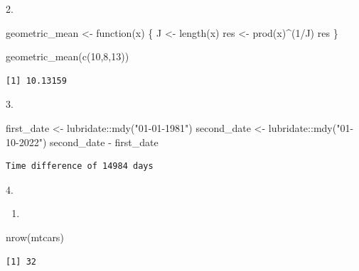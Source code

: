 \documentclass[
  letterpaper,
  DIV=11,
  numbers=noendperiod]{scrreprt}
\newenvironment{Shaded}{\begin{snugshade}}{\end{snugshade}}
\newcommand{\ControlFlowTok}[1]{\textcolor[rgb]{0.00,0.23,0.31}{#1}}
\newcommand{\DecValTok}[1]{\textcolor[rgb]{0.68,0.00,0.00}{#1}}
\newcommand{\FunctionTok}[1]{\textcolor[rgb]{0.28,0.35,0.67}{#1}}
\newcommand{\NormalTok}[1]{\textcolor[rgb]{0.00,0.23,0.31}{#1}}
\newcommand{\OtherTok}[1]{\textcolor[rgb]{0.00,0.23,0.31}{#1}}
\newcommand{\SpecialCharTok}[1]{\textcolor[rgb]{0.37,0.37,0.37}{#1}}
\newcommand{\StringTok}[1]{\textcolor[rgb]{0.13,0.47,0.30}{#1}}
\providecommand{\tightlist}{%
  \setlength{\itemsep}{0pt}\setlength{\parskip}{0pt}}\usepackage{longtable,booktabs,array}
\begin{document}
2.

\begin{Shaded}
\begin{Highlighting}[]
\NormalTok{geometric\_mean }\OtherTok{\textless{}{-}} \ControlFlowTok{function}\NormalTok{(x) \{}
\NormalTok{  J }\OtherTok{\textless{}{-}} \FunctionTok{length}\NormalTok{(x)}
\NormalTok{  res }\OtherTok{\textless{}{-}} \FunctionTok{prod}\NormalTok{(x)}\SpecialCharTok{\^{}}\NormalTok{(}\DecValTok{1}\SpecialCharTok{/}\NormalTok{J)}
\NormalTok{  res}
\NormalTok{\}}

\FunctionTok{geometric\_mean}\NormalTok{(}\FunctionTok{c}\NormalTok{(}\DecValTok{10}\NormalTok{,}\DecValTok{8}\NormalTok{,}\DecValTok{13}\NormalTok{))}
\end{Highlighting}
\end{Shaded}

\begin{verbatim}
[1] 10.13159
\end{verbatim}

3.

\begin{Shaded}
\begin{Highlighting}[]
\NormalTok{first\_date }\OtherTok{\textless{}{-}}\NormalTok{ lubridate}\SpecialCharTok{::}\FunctionTok{mdy}\NormalTok{(}\StringTok{"01{-}01{-}1981"}\NormalTok{)}
\NormalTok{second\_date }\OtherTok{\textless{}{-}}\NormalTok{ lubridate}\SpecialCharTok{::}\FunctionTok{mdy}\NormalTok{(}\StringTok{"01{-}10{-}2022"}\NormalTok{)}
\NormalTok{second\_date }\SpecialCharTok{{-}}\NormalTok{ first\_date}
\end{Highlighting}
\end{Shaded}

\begin{verbatim}
Time difference of 14984 days
\end{verbatim}

4.

\begin{enumerate}
\def\labelenumi{\alph{enumi})}
\tightlist
\item
\end{enumerate}

\begin{Shaded}
\begin{Highlighting}[]
\FunctionTok{nrow}\NormalTok{(mtcars)}
\end{Highlighting}
\end{Shaded}

\begin{verbatim}
[1] 32
\end{verbatim}
\end{document}
